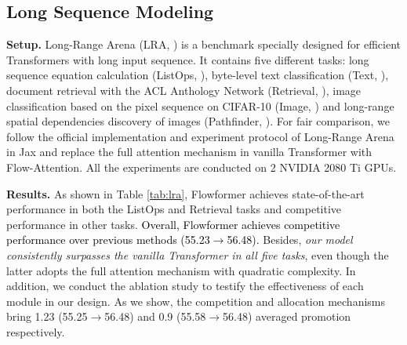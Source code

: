 \documentclass[nohyperref]{article}
\theoremstyle{plain}
\theoremstyle{definition}
\theoremstyle{remark}
\newcommand{\update}[1]{{\textcolor{black}{#1}}}
\begin{document}
\subsection{Long Sequence Modeling}

\textbf{Setup.} Long-Range Arena (LRA, \citealt{Tay2021LongRA}) is a benchmark specially designed for efficient Transformers with long input sequence. It contains five different tasks: long sequence equation calculation (ListOps, \citealt{Nangia2018ListOpsAD}), byte-level text classification (Text, \citealt{Maas2011LearningWV}), document retrieval with the ACL Anthology Network (Retrieval, \citealt{Radev2013TheAA}), image classification based on the pixel sequence on CIFAR-10 (Image, \citealt{Krizhevsky2009LearningML}) and long-range spatial dependencies discovery of images (Pathfinder, \citealt{Linsley2018LearningLS}). For fair comparison, we follow the official implementation and experiment protocol of Long-Range Arena in Jax \cite{jax2018github} and replace the full attention mechanism in vanilla Transformer with Flow-Attention. All the experiments are conducted on 2 NVIDIA 2080 Ti GPUs.

\textbf{Results.} As shown in Table \ref{tab:lra}, Flowformer achieves state-of-the-art performance in both the ListOps and Retrieval tasks and competitive performance in other tasks. \update{Overall, Flowformer achieves competitive performance over previous methods (55.23$\to$56.48).} Besides, \emph{our model consistently surpasses the vanilla Transformer in all five tasks}, even though the latter adopts the full attention mechanism with quadratic complexity. In addition, we conduct the ablation study to testify the effectiveness of each module in our design. As we show, the competition and allocation mechanisms bring 1.23 (55.25$\to$56.48) and 0.9 (55.58$\to$56.48) averaged promotion respectively.
\end{document}
